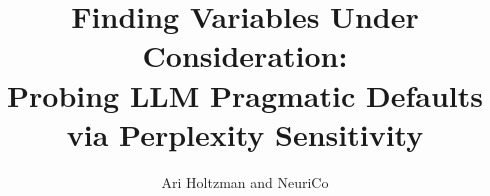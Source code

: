 \documentclass{article}
\title{Finding Variables Under Consideration:\\Probing LLM Pragmatic Defaults via Perplexity Sensitivity}
\author{Ari Holtzman and NeuriCo}
\begin{document}
\maketitle

\begin{abstract}

\end{abstract}











\appendix

\end{document}
